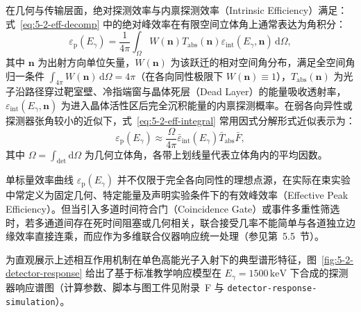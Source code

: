 在几何与传输层面，绝对探测效率与内禀探测效率（Intrinsic Efficiency）满足：
式~\eqref{eq:5-2-eff-decomp} 中的绝对峰效率在有限空间立体角上通常表达为角积分：
\begin{equation}\label{eq:5-2-eff-integral}
\varepsilon_{\mathrm{p}}(E_\gamma) = \frac{1}{4\pi} \int_{\Omega} W(\mathbf{n}) T_{\mathrm{abs}}(\mathbf{n}) \varepsilon_{\mathrm{int}}(E_\gamma, \mathbf{n}) \, \mathrm{d}\Omega,
\end{equation}
其中 $\mathbf{n}$ 为出射方向单位矢量，$W(\mathbf{n})$ 为该跃迁的相对空间角分布，满足全空间角归一条件 $\int_{4\pi} W(\mathbf{n})\,\mathrm{d}\Omega = 4\pi$（在各向同性极限下 $W(\mathbf{n}) \equiv 1$），$T_{\mathrm{abs}}(\mathbf{n})$ 为光子沿路径穿过靶室壁、冷指端窗与晶体死层（Dead Layer）的能量吸收透射率，$\varepsilon_{\mathrm{int}}(E_\gamma, \mathbf{n})$ 为进入晶体活性区后完全沉积能量的内禀探测概率。在弱各向异性或探测器张角较小的近似下，式~\eqref{eq:5-2-eff-integral} 常用因式分解形式近似表示为：
\begin{equation}\label{eq:5-2-eff-geom}
\varepsilon_{\mathrm{p}}(E_\gamma) \approx \frac{\Omega}{4\pi} \bar{\varepsilon}_{\mathrm{int}}(E_\gamma) \bar{T}_{\mathrm{abs}} \bar{F},
\end{equation}
其中 $\Omega = \int_{\mathrm{det}} \mathrm{d}\Omega$ 为几何立体角，各带上划线量代表立体角内的平均因数。

单标量效率曲线 $\varepsilon_{\mathrm{p}}(E_\gamma)$ 并不仅限于完全各向同性的理想点源，在实际在束实验中常定义为固定几何、特定能量及声明实验条件下的有效峰效率（Effective Peak Efficiency）。但当引入多道时间符合门（Coincidence Gate）或事件多重性筛选时，若多通道间存在死时间阻塞或几何相关，联合接受几率不能简单与各道独立边缘效率直接连乘，而应作为多维联合仪器响应统一处理（参见第~5.5~节）。

为直观展示上述相互作用机制在单色高能光子入射下的典型谱形特征，图~\ref{fig:5-2-detector-response} 给出了基于标准教学响应模型在 $E_\gamma = 1500\,\text{keV}$ 下合成的探测器响应谱图（计算参数、脚本与图工件见附录~F 与 \texttt{detector-response-simulation}）。

